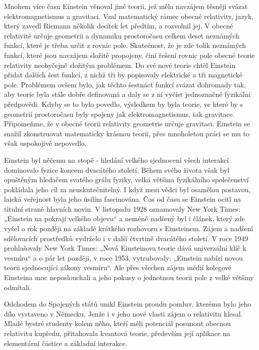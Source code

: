   Mnohem více času Einstein věnoval jiné teorii, jež měla navzájem těsněji svázat elektromagnetismus
  a gravitaci. Vzal matematický rámec obecné relativity, jazyk, který zavedl Riemann několik desítek
  let předtím, a rozvolnil jej. V obecné relativitě určuje geometrii a dynamiku prostoročasu celkem
  deset neznámých funkcí, které je třeba určit z rovnic pole. Skutečnost, že je zde tolik neznámých
  funkcí, které jsou navzájem složitě propojeny, činí řešení rovnic pole obecné teorie relativity
  neobyčejně složitým problémem. Do své nové teorie chtěl Einstein přidat dalších šest funkcí, z
  nichž tři by popisovaly elektrické a tři magnetické pole. Problémem ovšem bylo, jak těchto
  šestnáct funkcí svázat dohromady tak, aby teorie byla stále dobře definovaná a daly se z ní vyčíst
  jednoznačné fyzikální předpovědi. Kdyby se to bylo povedlo, výsledkem by byla teorie, ve které by
  s geometrií prostoročasu byly spojeny jak elektromagnetismus, tak gravitace. Připomeňme, že v
  obecné teorii relativity geometrie určuje gravitaci. Einstein se snažil zkonstruovat matematicky
  krásnou teorii, přes mnoholetou práci se mu to však uspokojivě nepovedlo. 
  
  Einstein byl něčemu na stopě - hledání velkého sjednocení všech interakcí dominovalo fyzice koncem
  dvacátého století. Během svého života však byl opuštěným hledačem svatého grálu fyziky, velká
  většina fyzikálního společenství pokládala jeho cíl za neuskutečnitelný. I když mezi vědci byl
  osamělou postavou, laická veřejnost byla jeho úsilím fascinována. Čas od času se Einstein ocitl na
  titulní straně hlavních novin. V listopadu 1928 oznamovaly New York Times: „Einstein na pokraji
  velkého objevu“ a neméně nadšený byl i článek, který zde vyšel o rok později na základě krátkého
  rozhovoru s Einsteinem. Zájem a nadšení sdělovacích prostředků vydrželo i v další čtvrtině
  dvacátého století. V roce 1949 prohlašovaly New York Times: „Nová Einsteinova teorie dává
  univerzální klíč k vesmíru“ a o pár let později, v roce 1953, vytrubovaly: „Einstein nabízí novou
  teorii sjednocující zákony vesmíru“. Ale přes všechen zájem médií kolegové Einsteina moc
  neposlouchali a jeho pokusy o jednotnou teorii pole z velké většiny odmítali. 
  
  Odchodem do Spojených států unikl Einstein proudu pomluv, kterému bylo jeho dílo vystaveno v
  Německu. Jenže i v jeho nové vlasti zájem o relativitu klesal. Mladé bystré studenty kolem něho,
  kteří měli potenciál posunout obecnou relativitu kupředu, přitahovala kvantová teorie, především
  její aplikace na elementární částice a základní interakce. 
  
